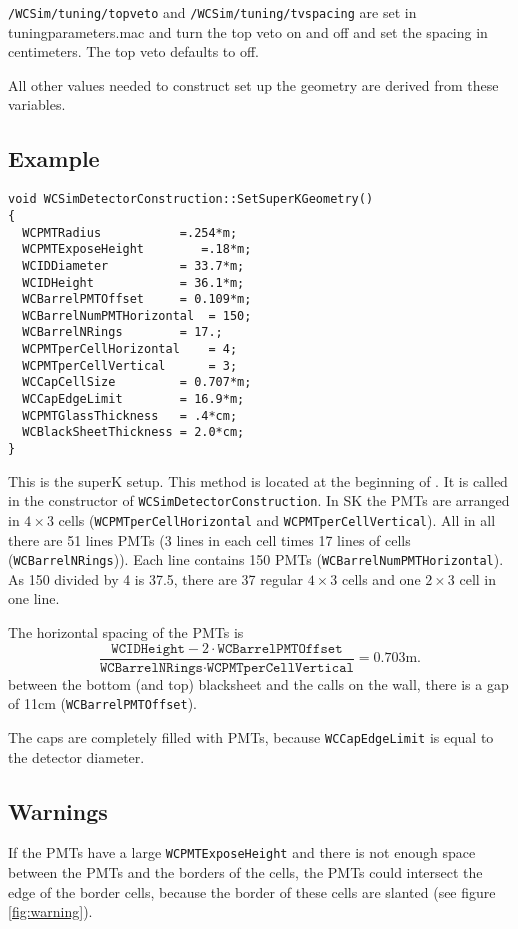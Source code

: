 \texttt{/WCSim/tuning/topveto} and \texttt{/WCSim/tuning/tvspacing} are set in tuning\textunderscore parameters.mac and turn the top veto on and off and set the spacing in centimeters.  The top veto defaults to off.

All other values needed to construct set up the geometry are derived from these variables.

\subsection{Example}

\begin{verbatim}
void WCSimDetectorConstruction::SetSuperKGeometry()
{
  WCPMTRadius           =.254*m;
  WCPMTExposeHeight        =.18*m;
  WCIDDiameter          = 33.7*m;
  WCIDHeight            = 36.1*m;
  WCBarrelPMTOffset     = 0.109*m;
  WCBarrelNumPMTHorizontal  = 150;
  WCBarrelNRings        = 17.;
  WCPMTperCellHorizontal    = 4;
  WCPMTperCellVertical      = 3;
  WCCapCellSize         = 0.707*m;
  WCCapEdgeLimit        = 16.9*m;
  WCPMTGlassThickness   = .4*cm;
  WCBlackSheetThickness = 2.0*cm;
}
\end{verbatim}

This is the superK setup. This method is located at the beginning of . It is called in the constructor of \texttt{WCSimDetectorConstruction}.
In SK the PMTs are arranged in $4 \times 3$ cells (\texttt{WCPMTperCellHorizontal} and \texttt{WCPMTperCellVertical}). 
All in all there are 51 lines PMTs (3 lines in each cell times 17 lines of cells (\texttt{WCBarrelNRings})). Each line contains 150 PMTs (\texttt{WCBarrelNumPMTHorizontal}). As 150 divided by 4 is 37.5, there are 37 regular $4 \times 3$ cells and one $2 \times 3$ cell in one line.

The horizontal spacing of the PMTs is
\[
\frac{\texttt{WCIDHeight} - 2\cdot\texttt{WCBarrelPMTOffset}}
{\texttt{WCBarrelNRings} \cdot \texttt{WCPMTperCellVertical}}
= 0.703 \mathrm{m}.
\]
between the bottom (and top) blacksheet and the calls on the wall, there is a gap of 11cm (\texttt{WCBarrelPMTOffset}).

The caps are completely filled with PMTs, because \texttt{WCCapEdgeLimit} is equal to the detector diameter. 



\subsection{Warnings}
If the PMTs have a large \texttt{WCPMTExposeHeight} and there is not enough space between the PMTs and the borders of the cells, the PMTs could intersect the edge of the border cells, because the border of these cells are slanted (see figure \ref{fig:warning}). 

